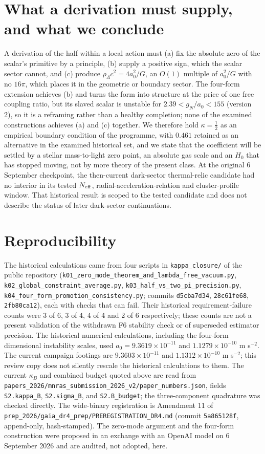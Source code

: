 \documentclass[11pt,letterpaper]{article}
\begin{document}
\section{What a derivation must supply, and what we conclude}
A derivation of the half within a local action must (a) fix the absolute zero of the scalar's primitive by a principle, (b) supply a positive sign, which the scalar sector cannot, and (c) produce $\rho_\Lambda c^2=4a_0^2/G$, an $O(1)$ multiple of $a_0^2/G$ with no $16\pi$, which places it in the geometric or boundary sector. The four-form extension achieves (b) and turns the form into structure at the price of one free coupling ratio, but its slaved scalar is unstable for $2.39<g_N/a_0<155$ (version 2), so it is a reframing rather than a healthy completion; none of the examined constructions achieves (a) and (c) together. We therefore hold $\kappa=\tfrac12$ as an empirical boundary condition of the programme, with $0.461$ retained as an alternative in the examined historical set, and we state that the coefficient will be settled by a stellar mass-to-light zero point, an absolute gas scale and an $H_0$ that has stopped moving, not by more theory of the present class. At the original 6 September checkpoint, the then-current dark-sector thermal-relic candidate had no interior in its tested $N_{\rm eff}$, radial-acceleration-relation and cluster-profile window. That historical result is scoped to the tested candidate and does not describe the status of later dark-sector continuations.

\section*{Reproducibility}
\sloppy The historical calculations came from four scripts in \texttt{kappa\_closure/} of the public repository (\texttt{k01\_zero\_mode\_theorem\_and\_lambda\_free\_vacuum.py}, \texttt{k02\_global\_constraint\_average.py}, \texttt{k03\_half\_vs\_two\_pi\_precision.py}, \texttt{k04\_four\_form\_promotion\_consistency.py}; commits \texttt{d5cba7d34}, \texttt{28c61fe68}, \texttt{2fb80ca12}), each with checks that can fail. Their historical requirement-failure counts were 3 of 6, 3 of 4, 4 of 4 and 2 of 6 respectively; these counts are not a present validation of the withdrawn F6 stability check or of superseded estimator precision. The historical numerical calculations, including the four-form dimensional instability scales, used $a_0=9.3619\times10^{-11}$ and $1.1279\times10^{-10}$ m s$^{-2}$. The current campaign footings are $9.3603\times10^{-11}$ and $1.1312\times10^{-10}$ m s$^{-2}$; this review copy does not silently rescale the historical calculations to them. The current $\kappa_B$ and combined budget quoted above are read from \texttt{papers\_2026/mnras\_submission\_2026\_v2/paper\_numbers.json}, fields \texttt{S2.kappa\_B}, \texttt{S2.sigma\_B}, and \texttt{S2.B\_budget}; the three-component quadrature was checked directly. The wide-binary registration is Amendment 11 of \texttt{prep\_2026/gaia\_dr4\_prep/PREREGISTRATION\_DR4.md} (commit \texttt{5a865128f}, append-only, hash-stamped). The zero-mode argument and the four-form construction were proposed in an exchange with an OpenAI model on 6 September 2026 and are audited, not adopted, here.
\end{document}
